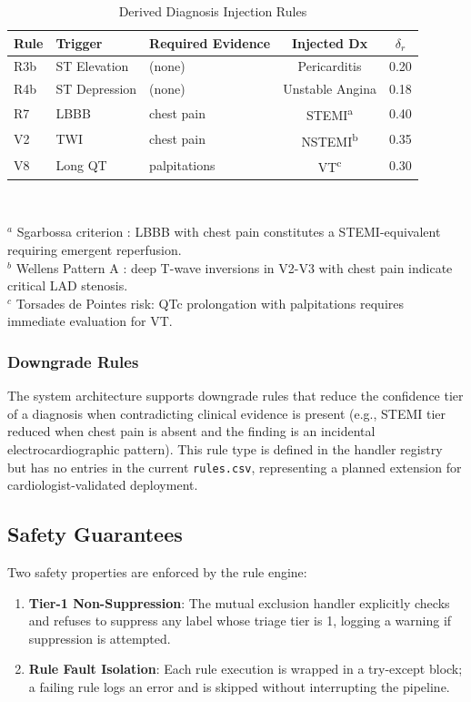 \documentclass[journal]{IEEEtran}
\begin{document}
\begin{table}[!t]
\centering
\caption{Derived Diagnosis Injection Rules}
\label{tab:derived}
\setlength{\tabcolsep}{3pt}
\begin{tabular}{@{}lllcc@{}}
  \toprule
  Rule & Trigger & Required Evidence & Injected Dx & $\delta_r$ \\
  \midrule
  R3b & ST Elevation & (none)       & Pericarditis      & 0.20 \\
  R4b & ST Depression & (none)      & Unstable Angina   & 0.18 \\
  R7  & LBBB         & chest pain   & STEMI\textsuperscript{a} & 0.40 \\
  V2  & TWI          & chest pain   & NSTEMI\textsuperscript{b} & 0.35 \\
  V8  & Long QT      & palpitations & VT\textsuperscript{c}     & 0.30 \\
  \bottomrule
\end{tabular}\\[2pt]
\raggedright
\footnotesize
$^a$ Sgarbossa criterion \cite{sgarbossa1996electrocardiographic}: LBBB
     with chest pain constitutes a STEMI-equivalent requiring emergent
     reperfusion.\\
$^b$ Wellens Pattern A \cite{zwaan1989wellens}: deep T-wave inversions
     in V2-V3 with chest pain indicate critical LAD stenosis.\\
$^c$ Torsades de Pointes risk: QTc prolongation with palpitations
     requires immediate evaluation for VT.
\end{table}

\subsubsection{Downgrade Rules}
The system architecture supports downgrade rules that reduce the
confidence tier of a diagnosis when contradicting clinical evidence
is present (e.g., STEMI tier reduced when chest pain is absent and
the finding is an incidental electrocardiographic pattern).
This rule type is defined in the handler registry but has no entries
in the current \texttt{rules.csv}, representing a planned extension
for cardiologist-validated deployment.

\subsection{Safety Guarantees}
Two safety properties are enforced by the rule engine:
\begin{enumerate}
  \item \textbf{Tier-1 Non-Suppression}: The mutual exclusion handler
        explicitly checks and refuses to suppress any label whose
        triage tier is 1, logging a warning if suppression is
        attempted.
  \item \textbf{Rule Fault Isolation}: Each rule execution is wrapped
        in a try-except block; a failing rule logs an error and is
        skipped without interrupting the pipeline.
\end{enumerate}
\end{document}
